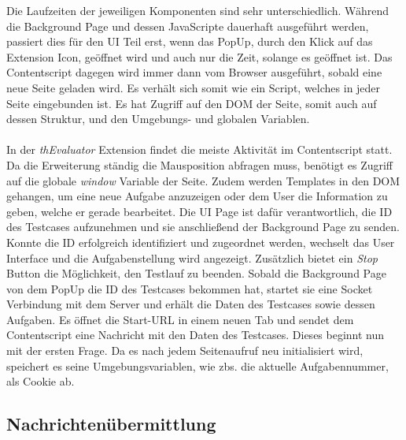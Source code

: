 Die Laufzeiten der jeweiligen Komponenten sind sehr unterschiedlich. Während die Background Page und dessen JavaScripte dauerhaft ausgeführt werden, passiert dies für den UI Teil erst, wenn das PopUp, durch den Klick auf das Extension Icon, geöffnet wird und auch nur die Zeit, solange es geöffnet ist. Das Contentscript dagegen wird immer dann vom Browser ausgeführt, sobald eine neue Seite geladen wird. Es verhält sich somit wie ein Script, welches in jeder Seite eingebunden ist. Es hat Zugriff auf den DOM der Seite, somit auch auf dessen Struktur, und den Umgebungs- und globalen Variablen.\\
\\
In der \textit{thEvaluator} Extension findet die meiste Aktivität im Contentscript statt. Da die Erweiterung ständig die Mausposition abfragen muss, benötigt es Zugriff auf die globale \textit{window} Variable der Seite. Zudem werden Templates in den DOM gehangen, um eine neue Aufgabe anzuzeigen oder dem User die Information zu geben, welche er gerade bearbeitet. Die UI Page ist dafür verantwortlich, die ID des Testcases aufzunehmen und sie anschließend der Background Page zu senden. Konnte die ID erfolgreich identifiziert und zugeordnet werden, wechselt das User Interface und die Aufgabenstellung wird angezeigt. Zusätzlich bietet ein \textit{Stop} Button die Möglichkeit, den Testlauf zu beenden. Sobald die Background Page von dem PopUp die ID des Testcases bekommen hat, startet sie eine Socket Verbindung mit dem Server und erhält die Daten des Testcases sowie dessen Aufgaben. Es öffnet die Start-URL in einem neuen Tab und sendet dem Contentscript eine Nachricht mit den Daten des Testcases. Dieses beginnt nun mit der ersten Frage. Da es nach jedem Seitenaufruf neu initialisiert wird, speichert es seine Umgebungsvariablen, wie zbs. die aktuelle Aufgabennummer, als Cookie ab.


\subsection{Nachrichtenübermittlung}

